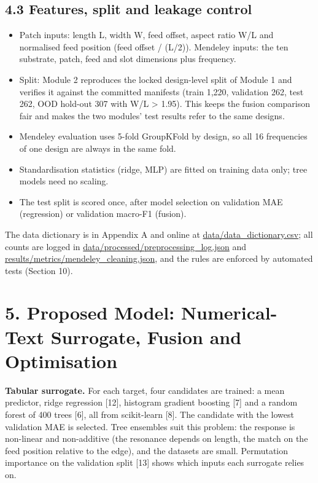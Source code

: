 \documentclass[11pt,a4paper]{article}
\begin{document}
\subsection*{4.3 Features, split and leakage control}
\begin{itemize}[leftmargin=*,itemsep=1pt]
\item Patch inputs: length L, width W, feed offset, aspect ratio W/L and normalised feed position (feed offset / (L/2)). Mendeley inputs: the ten substrate, patch, feed and slot dimensions plus frequency.
\item Split: Module 2 reproduces the locked design-level split of Module 1 and verifies it against the committed manifests (train 1,220, validation 262, test 262, OOD hold-out 307 with W/L > 1.95). This keeps the fusion comparison fair and makes the two modules' test results refer to the same designs.
\item Mendeley evaluation uses 5-fold GroupKFold by design, so all 16 frequencies of one design are always in the same fold.
\item Standardisation statistics (ridge, MLP) are fitted on training data only; tree models need no scaling.
\item The test split is scored once, after model selection on validation MAE (regression) or validation macro-F1 (fusion).
\end{itemize}
The data dictionary is in Appendix A and online at \href{https://github.com/rathiabeth-sudo/902---Module-2/blob/main/data/data_dictionary.csv}{data/data\_dictionary.csv}; all counts are logged in \href{https://github.com/rathiabeth-sudo/902---Module-2/blob/main/data/processed/preprocessing_log.json}{data/processed/preprocessing\_log.json} and \href{https://github.com/rathiabeth-sudo/902---Module-2/blob/main/results/metrics/mendeley_cleaning.json}{results/metrics/mendeley\_cleaning.json}, and the rules are enforced by automated tests (Section 10).

\section*{5. Proposed Model: Numerical-Text Surrogate, Fusion and Optimisation}
\textbf{Tabular surrogate.} For each target, four candidates are trained: a mean predictor, ridge regression [12], histogram gradient boosting [7] and a random forest of 400 trees [6], all from scikit-learn [8]. The candidate with the lowest validation MAE is selected. Tree ensembles suit this problem: the response is non-linear and non-additive (the resonance depends on length, the match on the feed position relative to the edge), and the datasets are small. Permutation importance on the validation split [13] shows which inputs each surrogate relies on.
\end{document}
